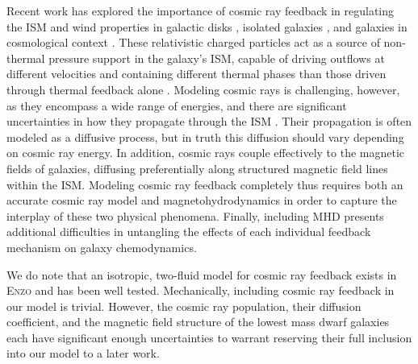 \documentclass[twocolumn]{aastex61}
\begin{document}
Recent work has explored the importance of cosmic ray feedback in regulating the ISM and wind properties in galactic disks \citep{Hanasz2013,GirichidisCR,Simpson2016,Farber2017}, isolated galaxies \citep{SalemBryanCorlies,Salem2015,Pakmor2016,Ruszkowski2017}, and galaxies in cosmological context \citep{SalemBryanHummels}. These relativistic charged particles act as a source of non-thermal pressure support in the galaxy's ISM, capable of driving outflows at different velocities and containing different thermal phases than those driven through thermal feedback alone \citep{SalemBryanCorlies}. Modeling cosmic rays is challenging, however, as they encompass a wide range of energies, and there are significant uncertainties in how they propagate through the ISM \citep[e.g.][]{Wiener2017}. Their propagation is often modeled as a diffusive process, but in truth this diffusion should vary depending on cosmic ray energy. In addition, cosmic rays couple effectively to the magnetic fields of galaxies, diffusing preferentially along structured magnetic field lines within the ISM. Modeling cosmic ray feedback completely thus requires both an accurate cosmic ray model and magnetohydrodynamics in order to capture the interplay of these two physical phenomena. Finally, including MHD presents additional difficulties in untangling the effects of each individual feedback mechanism on galaxy chemodynamics.

We do note that an isotropic, two-fluid model for cosmic ray feedback exists in  \textsc{Enzo} \citep{SalemBryan2014,Salem2015} and has been well tested. Mechanically, including cosmic ray feedback in our model is trivial. However, the cosmic ray population, their diffusion coefficient, and the magnetic field structure of the lowest mass dwarf galaxies each have significant enough uncertainties to warrant reserving their full inclusion into our model to a later work.



\end{document}
